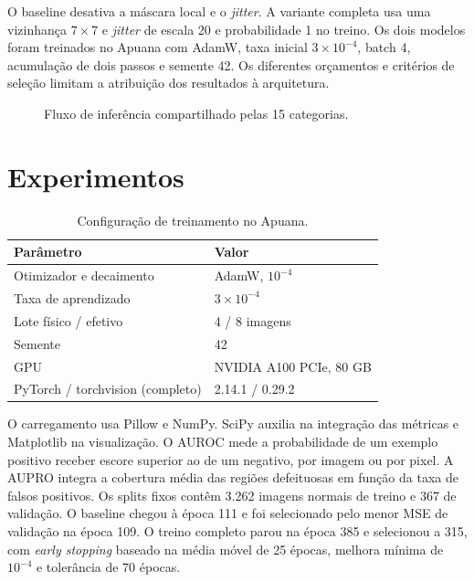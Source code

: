 \documentclass[conference]{IEEEtran}
\begin{document}
O baseline desativa a máscara local e o \textit{jitter}. A variante completa usa uma vizinhança $7\times7$ e \textit{jitter} de escala 20 e probabilidade 1 no treino. Os dois modelos foram treinados no Apuana com AdamW, taxa inicial $3\times10^{-4}$, batch 4, acumulação de dois passos e semente 42. Os diferentes orçamentos e critérios de seleção limitam a atribuição dos resultados à arquitetura.

\begin{figure}[htbp]
\centering
{}
\caption{Fluxo de inferência compartilhado pelas 15 categorias.}
\end{figure}

\section{Experimentos}
\begin{table}[htbp]\centering
\caption{Configuração de treinamento no Apuana.}
\begin{tabular}{ll}\toprule
Parâmetro & Valor\\\midrule
Otimizador e decaimento & AdamW, $10^{-4}$\\
Taxa de aprendizado & $3\times10^{-4}$\\
Lote físico / efetivo & 4 / 8 imagens\\
Semente & 42\\
GPU & NVIDIA A100 PCIe, 80 GB\\
PyTorch / torchvision (completo) & 2.14.1 / 0.29.2\\
\bottomrule\end{tabular}\end{table}
O carregamento usa Pillow e NumPy. SciPy auxilia na integração das métricas e Matplotlib na visualização. O AUROC mede a probabilidade de um exemplo positivo receber escore superior ao de um negativo, por imagem ou por pixel. A AUPRO integra a cobertura média das regiões defeituosas em função da taxa de falsos positivos.
Os splits fixos contêm 3.262 imagens normais de treino e 367 de validação. O baseline chegou à época 111 e foi selecionado pelo menor MSE de validação na época 109. O treino completo parou na época 385 e selecionou a 315, com \textit{early stopping} baseado na média móvel de 25 épocas, melhora mínima de $10^{-4}$ e tolerância de 70 épocas.
\end{document}
